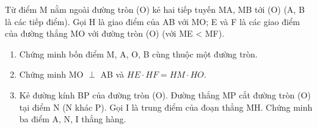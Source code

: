\begin{ex}
Từ điểm M nằm ngoài đường tròn (O) kẻ hai tiếp tuyến MA, MB tới (O) (A, B là các tiếp điểm). Gọi H là giao điểm của AB với MO; E và F là các giao điểm của đường thẳng MO với đường tròn (O) (với ME < MF).
	\begin{enumerate}
		\item[1.] Chứng minh bốn điểm M, A, O, B cùng thuộc một đường tròn.
		\item[2.] Chứng minh MO $\perp$ AB và $HE \cdot HF = HM \cdot HO$.
		\item[3.] Kẻ đường kính BP của đường tròn (O). Đường thẳng MP cắt đường tròn (O) tại điểm N (N khác P). Gọi I là trung điểm của đoạn thẳng MH. Chứng minh ba điểm A, N, I thẳng hàng.
	\end{enumerate}
\end{ex}
